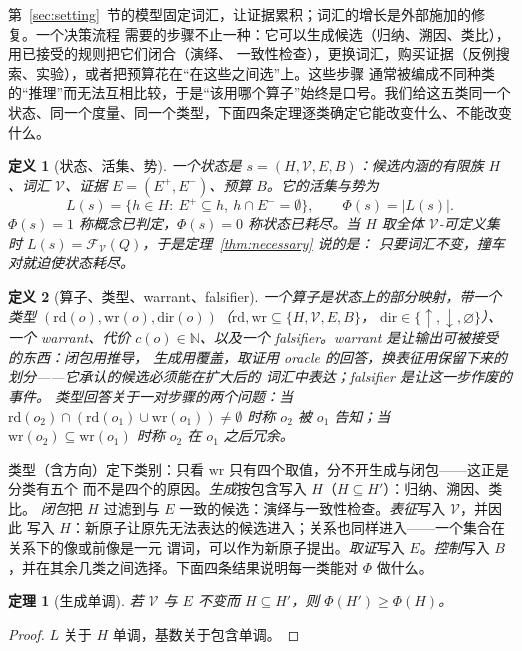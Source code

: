 \documentclass[11pt]{ctexart}
\newtheorem{definition}{定义}
\newtheorem{theorem}{定理}
\newcommand{\Vocab}{\mathcal{V}}
\newcommand{\Epos}{E^{+}}
\newcommand{\Eneg}{E^{-}}
\begin{document}
第~\ref{sec:setting}~节的模型固定词汇，让证据累积；词汇的增长是外部施加的修复。一个决策流程
需要的步骤不止一种：它可以生成候选（归纳、溯因、类比），用已接受的规则把它们闭合（演绎、
一致性检查），更换词汇，购买证据（反例搜索、实验），或者把预算花在“在这些之间选”上。这些步骤
通常被编成不同种类的“推理”而无法互相比较，于是“该用哪个算子”始终是口号。我们给这五类同一个
状态、同一个度量、同一个类型，下面四条定理逐类确定它能改变什么、不能改变什么。

\begin{definition}[状态、活集、势]
一个\emph{状态}是 $s=(H,\Vocab,E,B)$：候选内涵的有限族 $H$、词汇 $\Vocab$、证据
$E=(\Epos,\Eneg)$、预算 $B$。它的\emph{活集}与\emph{势}为
\[
  L(s)=\{h\in H:\ \Epos\subseteq h,\ h\cap\Eneg=\emptyset\},
  \qquad \Phi(s)=|L(s)|.
\]
$\Phi(s)=1$ 称概念已\emph{判定}，$\Phi(s)=0$ 称状态已\emph{耗尽}。当 $H$ 取全体
$\Vocab$-可定义集时 $L(s)=\mathcal{F}_{\Vocab}(Q)$，于是定理~\ref{thm:necessary} 说的是：
只要词汇不变，撞车对就迫使状态耗尽。
\end{definition}

\begin{definition}[算子、类型、warrant、falsifier]
一个\emph{算子}是状态上的部分映射，带一个类型
$(\mathrm{rd}(o),\mathrm{wr}(o),\mathrm{dir}(o))$（$\mathrm{rd},\mathrm{wr}\subseteq\{H,\Vocab,E,B\}$，
$\mathrm{dir}\in\{\uparrow,\downarrow,\varnothing\}$）、一个 \emph{warrant}、代价
$c(o)\in\mathbb{N}$、以及一个 \emph{falsifier}。warrant 是让输出可被接受的东西：闭包用推导，
生成用覆盖，取证用 oracle 的回答，换表征用保留下来的划分——它承认的候选必须能在扩大后的
词汇中表达；falsifier 是让这一步作废的事件。
类型回答关于一对步骤的两个问题：当 $\mathrm{rd}(o_2)\cap(\mathrm{rd}(o_1)\cup\mathrm{wr}(o_1))
\neq\emptyset$ 时称 $o_2$ 被 $o_1$ \emph{告知}；当
$\mathrm{wr}(o_2)\subseteq\mathrm{wr}(o_1)$ 时称 $o_2$ 在 $o_1$ 之后\emph{冗余}。
\end{definition}

类型（含方向）定下类别：只看 $\mathrm{wr}$ 只有四个取值，分不开生成与闭包——这正是分类有五个
而不是四个的原因。\emph{生成}按包含写入 $H$（$H\subseteq H'$）：归纳、溯因、类比。
\emph{闭包}把 $H$ 过滤到与 $E$ 一致的候选：演绎与一致性检查。\emph{表征}写入 $\Vocab$，并因此
写入 $H$：新原子让原先无法表达的候选进入；关系也同样进入——一个集合在关系下的像或前像是一元
谓词，可以作为新原子提出。\emph{取证}写入 $E$。\emph{控制}写入 $B$，并在其余几类之间选择。下面四条结果说明每一类能对
$\Phi$ 做什么。

\begin{theorem}[生成单调]\label{thm:gen}
若 $\Vocab$ 与 $E$ 不变而 $H\subseteq H'$，则 $\Phi(H')\ge\Phi(H)$。
\end{theorem}
\begin{proof}
$L$ 关于 $H$ 单调，基数关于包含单调。
\end{proof}
\end{document}
